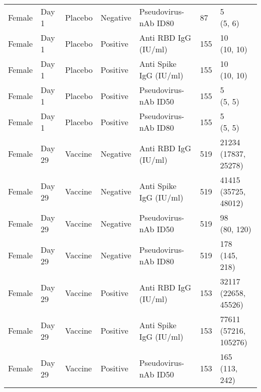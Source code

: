 \documentclass[]{book}
\theoremstyle{definition}
\theoremstyle{definition}
\theoremstyle{definition}
\newcommand{\1}{\mathbbm{1}}
\begin{document}
\begin{landscape}
\begin{ThreePartTable}
\begin{longtable}[t]{>{\raggedright\arraybackslash}p{7cm}llllll}
\hspace{1em}Female & Day 1 & Placebo & Negative & Pseudovirus-nAb ID80 & 87 & \makecell[l]{5\\(5, 6)}\\
\hspace{1em}Female & Day 1 & Placebo & Positive & Anti RBD IgG (IU/ml) & 155 & \makecell[l]{10\\(10, 10)}\\
\hspace{1em}Female & Day 1 & Placebo & Positive & Anti Spike IgG (IU/ml) & 155 & \makecell[l]{10\\(10, 10)}\\
\hspace{1em}Female & Day 1 & Placebo & Positive & Pseudovirus-nAb ID50 & 155 & \makecell[l]{5\\(5, 5)}\\
\hspace{1em}Female & Day 1 & Placebo & Positive & Pseudovirus-nAb ID80 & 155 & \makecell[l]{5\\(5, 5)}\\
\hspace{1em}Female & Day 29 & Vaccine & Negative & Anti RBD IgG (IU/ml) & 519 & \makecell[l]{21234\\(17837, 25278)}\\
\hspace{1em}Female & Day 29 & Vaccine & Negative & Anti Spike IgG (IU/ml) & 519 & \makecell[l]{41415\\(35725, 48012)}\\
\hspace{1em}Female & Day 29 & Vaccine & Negative & Pseudovirus-nAb ID50 & 519 & \makecell[l]{98\\(80, 120)}\\
\hspace{1em}Female & Day 29 & Vaccine & Negative & Pseudovirus-nAb ID80 & 519 & \makecell[l]{178\\(145, 218)}\\
\hspace{1em}Female & Day 29 & Vaccine & Positive & Anti RBD IgG (IU/ml) & 153 & \makecell[l]{32117\\(22658, 45526)}\\
\hspace{1em}Female & Day 29 & Vaccine & Positive & Anti Spike IgG (IU/ml) & 153 & \makecell[l]{77611\\(57216, 105276)}\\
\hspace{1em}Female & Day 29 & Vaccine & Positive & Pseudovirus-nAb ID50 & 153 & \makecell[l]{165\\(113, 242)}\\

\end{longtable}
\end{ThreePartTable}
\end{landscape}
\end{document}
